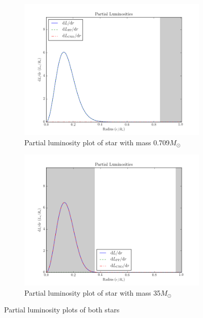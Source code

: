 \documentclass[11pt]{article}
\begin{document}
\begin{figure}[h!]
\centering
\begin{subfigure}{.5\textwidth}
  \centering
  \includegraphics[scale=0.5]{plots/star_comp-_X-0.73,Y-0.25,Z-0.02__Tc-9000000.0/partial_lumin.png}
  \caption{Partial luminosity plot of star with mass 0.709$M_\odot$}
  \label{fig:plsmall}
\end{subfigure}%
\begin{subfigure}{.5\textwidth}
  \centering
  \includegraphics[scale=0.5]{plots/star_comp-_X-0.73,Y-0.25,Z-0.02__Tc-33000000.0/partial_lumin.png}
  \caption{Partial luminosity plot of star with mass 35$M_\odot$}
  \label{fig:plbig}
\end{subfigure}
\caption{Partial luminosity plots of both stars}
\label{fig:pl}
\end{figure}
\end{document}
